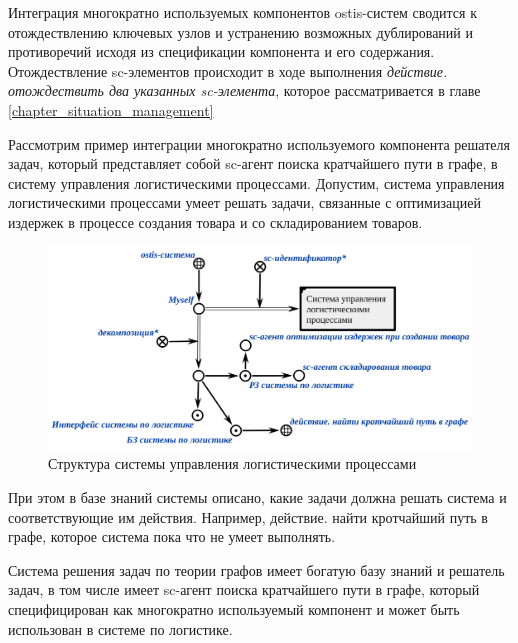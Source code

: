 Интеграция многократно используемых компонентов ostis-систем сводится к отождествлению ключевых узлов и устранению возможных дублирований и противоречий исходя из спецификации компонента и его содержания. Отождествление sc-элементов происходит в ходе выполнения \textit{действие. отождествить два указанных sc-элемента}, которое рассматривается в главе \ref{chapter_situation_management}

Рассмотрим пример интеграции многократно используемого компонента решателя задач, который представляет собой sc-агент поиска кратчайшего пути в графе, в систему управления логистическими процессами. Допустим, система управления логистическими процессами умеет решать задачи, связанные с оптимизацией издержек в процессе создания товара и со складированием товаров. 

\begin{figure}[H]
	\includegraphics[scale=0.5]{author/part5/figures/logistics_system.png}
	\caption{Структура системы управления логистическими процессами}
	\label{fig:logistics_system}
\end{figure}

При этом в базе знаний системы описано, какие задачи должна решать система и соответствующие им действия. Например, действие. найти кротчайший путь в графе, которое система пока что не умеет выполнять.

Система решения задач по теории графов имеет богатую базу знаний и решатель задач, в том числе имеет sc-агент поиска кратчайшего пути в графе, который специфицирован как многократно используемый компонент и может быть использован в системе по логистике.

